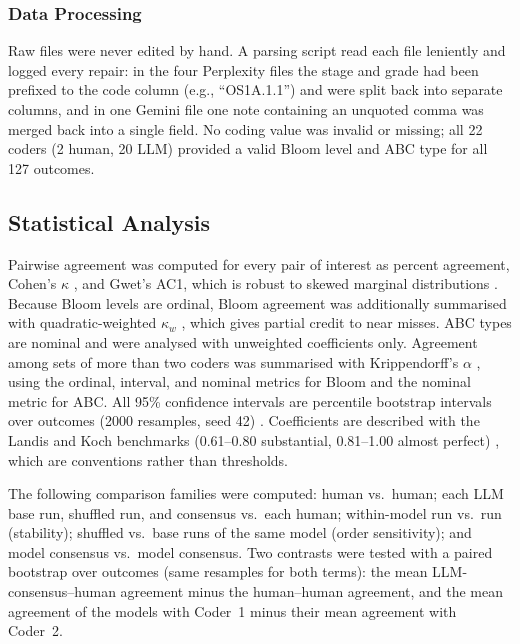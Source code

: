 \documentclass[journal,article,submit,pdftex,moreauthors]{Definitions/mdpi}
\begin{document}
\subsubsection{Data Processing}

Raw files were never edited by hand. A parsing script read each file leniently and logged every repair: in the four Perplexity files the stage and grade had been prefixed to the code column (e.g., ``OS1A.1.1'') and were split back into separate columns, and in one Gemini file one note containing an unquoted comma was merged back into a single field. No coding value was invalid or missing; all 22 coders (2 human, 20 LLM) provided a valid Bloom level and ABC type for all 127 outcomes.

\subsection{Statistical Analysis}
\label{sec:stats}

Pairwise agreement was computed for every pair of interest as percent agreement, Cohen's $\kappa$ \cite{cohen_1960}, and Gwet's AC1, which is robust to skewed marginal distributions \cite{gwet_2008}. Because Bloom levels are ordinal, Bloom agreement was additionally summarised with quadratic-weighted $\kappa_w$ \cite{cohen_1968}, which gives partial credit to near misses. ABC types are nominal and were analysed with unweighted coefficients only. Agreement among sets of more than two coders was summarised with Krippendorff's $\alpha$ \cite{krippendorff_2018, hayes_krippendorff_2007}, using the ordinal, interval, and nominal metrics for Bloom and the nominal metric for ABC. All 95\% confidence intervals are percentile bootstrap intervals over outcomes (2000 resamples, seed 42) \cite{efron_tibshirani_1993}. Coefficients are described with the Landis and Koch benchmarks (0.61--0.80 substantial, 0.81--1.00 almost perfect) \cite{landis_koch_1977}, which are conventions rather than thresholds.

The following comparison families were computed: human vs.\ human; each LLM base run, shuffled run, and consensus vs.\ each human; within-model run vs.\ run (stability); shuffled vs.\ base runs of the same model (order sensitivity); and model consensus vs.\ model consensus. Two contrasts were tested with a paired bootstrap over outcomes (same resamples for both terms): the mean LLM-consensus--human agreement minus the human--human agreement, and the mean agreement of the models with Coder~1 minus their mean agreement with Coder~2.
\end{document}
